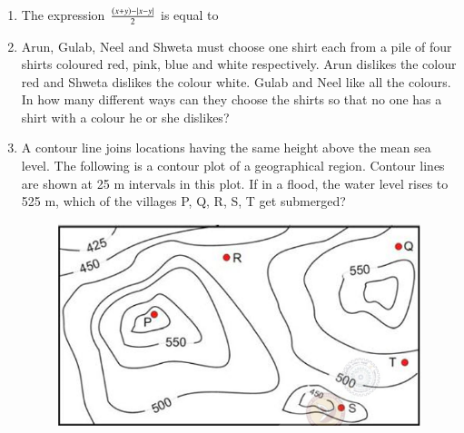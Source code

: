 \documentclass[a4paper, 11pt]{article}
\begin{document}
\begin{enumerate}
    \hfill{}

    \item The expression $\frac{\left(x+y\right)-\left\vert x-y\right\vert}{2}$ is equal to
    \begin{enumerate}
    \end{enumerate}
    
    \hfill{}
    
    \item Arun, Gulab, Neel and Shweta must choose one shirt each from a pile of four shirts coloured red, pink, blue and white respectively. Arun dislikes the colour red and Shweta dislikes the colour white. Gulab and Neel like all the colours. In how many different ways can they choose the shirts so that no one has a shirt with a colour he or she dislikes?
    \begin{enumerate}
    \end{enumerate}
    
    \hfill{}
    
    \item A contour line joins locations having the same height above the mean sea level. The following is a contour plot of a geographical region. Contour lines are shown at 25 m intervals in this plot. If in a flood, the water level rises to 525 m, which of the villages P, Q, R, S, T get submerged?
    
    \begin{figure}[h]
        \centering
        \includegraphics[width=0.4\columnwidth]{figs/q65.png}
        \label{fig:placeholder}
    \end{figure}
    

\end{enumerate}
\end{document}

